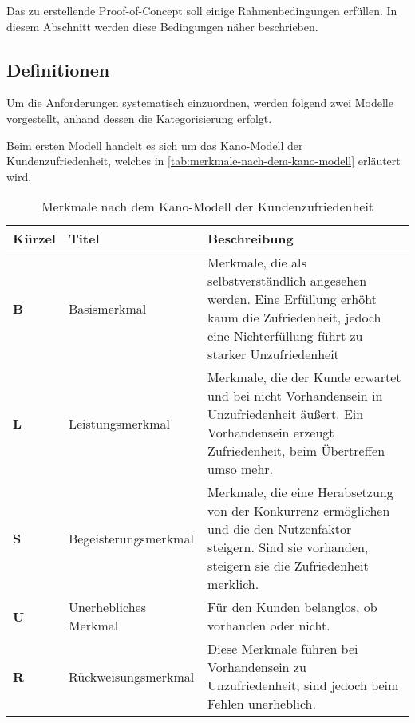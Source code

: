 
Das zu erstellende Proof-of-Concept soll einige Rahmenbedingungen erfüllen. In diesem Abschnitt werden diese Bedingungen näher beschrieben.
	
\subsection{Definitionen}
	
Um die Anforderungen systematisch einzuordnen, werden folgend zwei Modelle vorgestellt, anhand dessen die Kategorisierung erfolgt.

Beim ersten Modell handelt es sich um das Kano-Modell \cite{KanoModell} der Kundenzufriedenheit, welches in  \autoref{tab:merkmale-nach-dem-kano-modell} erläutert wird.
	
\begin{table}[H]
\begin{tabular}{ |p{1.15cm}|p{2.75cm}|p{9.6cm}| }
	\hline
	Kürzel & Titel & Beschreibung \\
	\hline
	\textbf{B} & Basis\-merkmal & Merkmale, die als selbstverständlich angesehen werden. Eine Erfüllung erhöht kaum die Zufriedenheit, jedoch eine Nichterfüllung führt zu starker Unzufriedenheit \\
	\hline
	\textbf{L} & Leistungs\-merkmal & Merkmale, die der Kunde erwartet und bei nicht Vorhandensein in Unzufriedenheit äußert. Ein Vorhandensein erzeugt Zufriedenheit, beim Übertreffen umso mehr. \\
	\hline
	\textbf{S} & Begeisterungs\-merkmal & Merkmale, die eine Herabsetzung von der Konkurrenz ermöglichen und die den Nutzenfaktor steigern. Sind sie vorhanden, steigern sie die Zufriedenheit merklich. \\
	\hline
	\textbf{U} & Unerhebliches Merkmal & Für den Kunden belanglos, ob vorhanden oder nicht. \\
	\hline
	\textbf{R} & Rückweisungs\-merkmal & Diese Merkmale führen bei Vorhandensein zu Unzufriedenheit, sind jedoch beim Fehlen unerheblich. \\
	\hline
\end{tabular}
 \captionsetup{justification=centering}
  \caption{Merkmale nach dem Kano-Modell der Kundenzufriedenheit}
   \label{tab:merkmale-nach-dem-kano-modell}
\end{table}

